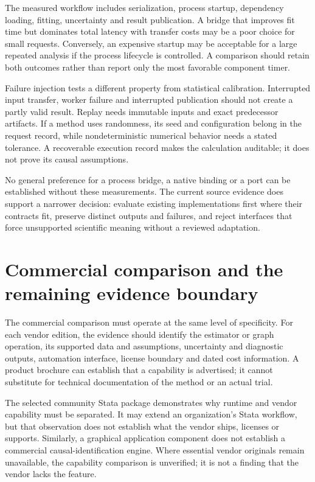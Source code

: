 The measured workflow includes serialization, process startup, dependency
loading, fitting, uncertainty and result publication. A bridge that improves
fit time but dominates total latency with transfer costs may be a poor choice
for small requests. Conversely, an expensive startup may be acceptable for a
large repeated analysis if the process lifecycle is controlled. A comparison
should retain both outcomes rather than report only the most favorable
component timer.

Failure injection tests a different property from statistical calibration.
Interrupted input transfer, worker failure and interrupted publication should
not create a partly valid result. Replay needs immutable inputs and exact
predecessor artifacts. If a method uses randomness, its seed and configuration
belong in the request record, while nondeterministic numerical behavior needs
a stated tolerance. A recoverable execution record makes the calculation
auditable; it does not prove its causal assumptions.

No general preference for a process bridge, a native binding or a port can
be established without these measurements. The current source evidence does
support a narrower decision: evaluate existing implementations first where
their contracts fit, preserve distinct outputs and failures, and reject
interfaces that force unsupported scientific meaning without a reviewed
adaptation.

\section{Commercial comparison and the remaining evidence boundary}

The commercial comparison must operate at the same level of specificity.
For each vendor edition, the evidence should identify the estimator or graph
operation, its supported data and assumptions, uncertainty and diagnostic
outputs, automation interface, license boundary and dated cost information.
A product brochure can establish that a capability is advertised; it cannot
substitute for technical documentation of the method or an actual trial.

The selected community Stata package demonstrates why runtime and vendor
capability must be separated. It may extend an organization's Stata workflow,
but that observation does not establish what the vendor ships, licenses or
supports. Similarly, a graphical application component does not establish a
commercial causal-identification engine. Where essential vendor originals
remain unavailable, the capability comparison is unverified; it is not a
finding that the vendor lacks the feature.

